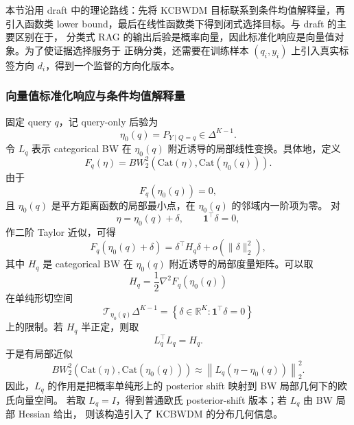 \documentclass[UTF8,a4paper,12pt,oneside]{ctexart}
\numberwithin{equation}{section}
\begin{document}
本节沿用 draft 中的理论路线：先将 KCBWDM 目标联系到条件均值解释量，再引入函数类
lower bound，最后在线性函数类下得到闭式选择目标。与 draft 的主要区别在于，
分类式 RAG 的输出后验是概率向量，因此标准化响应是向量值对象。为了使证据选择服务于
正确分类，还需要在训练样本 \((q_i,y_i)\) 上引入真实标签方向 \(d_i\)，得到一个监督的方向化版本。

\subsubsection{向量值标准化响应与条件均值解释量}

固定 query \(q\)，记 query-only 后验为
\[
    \eta_0(q)
    =
    P_{Y\mid Q=q}
    \in \Delta^{K-1}.
\]
令 \(L_q\) 表示 categorical BW 在 \(\eta_0(q)\) 附近诱导的局部线性变换。具体地，定义
\[
    F_q(\eta)
    =
    BW_2^2
    \left(
        \mathrm{Cat}(\eta),
        \mathrm{Cat}(\eta_0(q))
    \right).
\]
由于
\[
    F_q(\eta_0(q))=0,
\]
且 \(\eta_0(q)\) 是平方距离函数的局部最小点，在 \(\eta_0(q)\) 的邻域内一阶项为零。
对
\[
    \eta=\eta_0(q)+\delta,
    \qquad
    \mathbf 1^\top\delta=0,
\]
作二阶 Taylor 近似，可得
\[
    F_q(\eta_0(q)+\delta)
    =
    \delta^\top H_q\delta
    +
    o(\|\delta\|_2^2),
\]
其中 \(H_q\) 是 categorical BW 在 \(\eta_0(q)\) 附近诱导的局部度量矩阵。可以取
\[
    H_q
    =
    \frac{1}{2}
    \nabla^2F_q(\eta_0(q))
\]
在单纯形切空间
\[
    \mathcal T_{\eta_0(q)}\Delta^{K-1}
    =
    \left\{
        \delta\in\mathbb R^K:
        \mathbf 1^\top\delta=0
    \right\}
\]
上的限制。若 \(H_q\) 半正定，则取
\[
    L_q^\top L_q=H_q.
\]
于是有局部近似
\[
    BW_2^2
    \left(
        \mathrm{Cat}(\eta),
        \mathrm{Cat}(\eta_0(q))
    \right)
    \approx
    \left\|
        L_q(\eta-\eta_0(q))
    \right\|_2^2.
\]
因此，\(L_q\) 的作用是把概率单纯形上的 posterior shift 映射到 BW 局部几何下的欧氏向量空间。
若取 \(L_q=I\)，得到普通欧氏 posterior-shift 版本；若 \(L_q\) 由 BW 局部 Hessian 给出，
则该构造引入了 KCBWDM 的分布几何信息。
\end{document}
